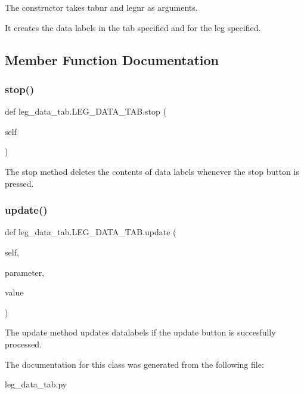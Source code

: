 The constructor takes tabnr and legnr as arguments. 

It creates the data labels in the tab specified and for the leg specified. 

\subsection{Member Function Documentation}
\mbox{\label{classleg__data__tab_1_1LEG__DATA__TAB_ab878dd9679f97dc656923aeec6fd7cb8}} 
\subsubsection{\texorpdfstring{stop()}{stop()}}
{\footnotesize\ttfamily def leg\+\_\+data\+\_\+tab.\+L\+E\+G\+\_\+\+D\+A\+T\+A\+\_\+\+T\+A\+B.\+stop (\begin{DoxyParamCaption}\item[{}]{self }\end{DoxyParamCaption})}



The stop method deletes the contents of data labels whenever the stop button is pressed. 

\mbox{\label{classleg__data__tab_1_1LEG__DATA__TAB_a4fc4d0afb8faa78cf61dfc692967c6eb}} 
\subsubsection{\texorpdfstring{update()}{update()}}
{\footnotesize\ttfamily def leg\+\_\+data\+\_\+tab.\+L\+E\+G\+\_\+\+D\+A\+T\+A\+\_\+\+T\+A\+B.\+update (\begin{DoxyParamCaption}\item[{}]{self,  }\item[{}]{parameter,  }\item[{}]{value }\end{DoxyParamCaption})}



The update method updates datalabels if the update button is succesfully processed. 



The documentation for this class was generated from the following file\+:\begin{DoxyCompactItemize}
\item 
leg\+\_\+data\+\_\+tab.\+py\end{DoxyCompactItemize}
